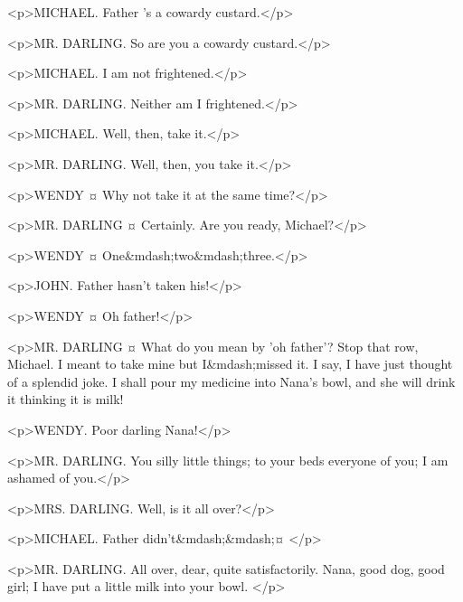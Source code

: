 <p>MICHAEL. Father 's a cowardy custard.</p>

<p>MR. DARLING. So are you a cowardy custard.</p>


<p>MICHAEL. I am not frightened.</p>

<p>MR. DARLING. Neither am I frightened.</p>

<p>MICHAEL. Well, then, take it.</p>

<p>MR. DARLING. Well, then, you take it.</p>

<p>WENDY ¤
Why not take it at the same time?</p>

<p>MR. DARLING ¤
Certainly. Are you ready, Michael?</p>

<p>WENDY ¤
One&mdash;two&mdash;three.</p>


<p>JOHN. Father hasn't taken his!</p>


<p>WENDY ¤
Oh father!</p>

<p>MR. DARLING ¤
What do you mean by 'oh father'? Stop that row, Michael. I meant to take mine but I&mdash;missed it.
I say, I have just thought of a splendid joke.
I shall pour my medicine into Nana's bowl, and she will drink it thinking it is milk!

<p>WENDY. Poor darling Nana!</p>

<p>MR. DARLING. You silly little things; to your beds everyone of you; I am ashamed of you.</p>


<p>MRS. DARLING. Well, is it all over?</p>

<p>MICHAEL. Father didn't&mdash;&mdash;¤
</p>

<p>MR. DARLING. All over, dear, quite satisfactorily.
Nana, good dog, good girl; I have put a little milk into your bowl.
</p>


